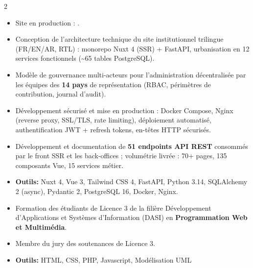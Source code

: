 \documentclass[10pt,a4paper,ragged2e,withhyper]{altacv}
\begin{document}
\begin{paracol}{2}
            \begin{itemize}
                \item Site en production : .
                \item Conception de l'architecture technique du site institutionnel trilingue (FR/EN/AR, RTL) : monorepo Nuxt 4 (SSR) + FastAPI, urbanisation en 12 services fonctionnels (\textasciitilde65 tables PostgreSQL).
                \item Modèle de gouvernance multi-acteurs pour l'administration décentralisée par les équipes des \textbf{14 pays} de représentation (RBAC, périmètres de contribution, journal d'audit).
                \item Développement sécurisé et mise en production : Docker Compose, Nginx (reverse proxy, SSL/TLS, rate limiting), déploiement automatisé, authentification JWT + refresh tokens, en-têtes HTTP sécurisés.
                \item Développement et documentation de \textbf{51 endpoints API REST} consommés par le front SSR et les back-offices ; volumétrie livrée : 70+ pages, 135 composants Vue, 15 services métier.
                \item \textcolor{SecondaryColor}{\textbf{Outils: }} Nuxt 4, Vue 3, Tailwind CSS 4, FastAPI, Python 3.14, SQLAlchemy 2 (async), Pydantic 2, PostgreSQL 16, Docker, Nginx.
            \end{itemize}
            \divider

            \newpage

            \begin{itemize}
                \item Formation des étudiants de Licence 3 de la filière Développement d'Applications et Systèmes d'Information (DASI) en {\textbf{Programmation Web et Multimédia}}.
                \item Membre du jury des soutenances de Licence 3.
                \item \textcolor{SecondaryColor}{\textbf{Outils: }} HTML, CSS, PHP, Javascript, Modélisation UML
            \end{itemize}
            \divider


\end{paracol}
\end{document}
